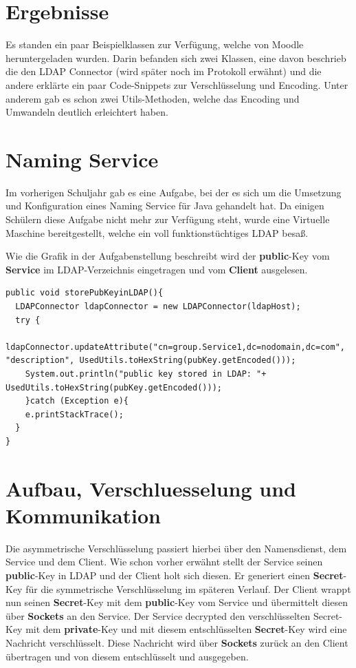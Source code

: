 
\section{Ergebnisse}
\label{sec:Ergebnisse}
Es standen ein paar Beispielklassen zur Verfügung, welche von Moodle heruntergeladen wurden. Darin befanden sich zwei Klassen, eine davon beschrieb die den LDAP Connector (wird später noch im Protokoll erwähnt) und die andere erklärte ein paar Code-Snippets zur Verschlüsselung und Encoding. Unter anderem gab es schon zwei Utils-Methoden, welche das Encoding und Umwandeln deutlich erleichtert haben.

\section{Naming Service}
\label{sec:Naming Service}
Im vorherigen Schuljahr gab es eine Aufgabe, bei der es sich um die Umsetzung und Konfiguration eines Naming Service für Java gehandelt hat. Da einigen Schülern diese Aufgabe nicht mehr zur Verfügung steht, wurde eine Virtuelle Maschine bereitgestellt, welche ein voll funktionstüchtiges LDAP besaß.

Wie die Grafik in der Aufgabenstellung beschreibt wird der \textbf{public}-Key vom \textbf{Service} im LDAP-Verzeichnis eingetragen und vom \textbf{Client} ausgelesen.

\begin{lstlisting}[style=Java, caption=LDAP store public-Key in LDAP]
public void storePubKeyinLDAP(){
  LDAPConnector ldapConnector = new LDAPConnector(ldapHost);
  try {
    ldapConnector.updateAttribute("cn=group.Service1,dc=nodomain,dc=com", "description", UsedUtils.toHexString(pubKey.getEncoded()));
    System.out.println("public key stored in LDAP: "+ UsedUtils.toHexString(pubKey.getEncoded()));
    }catch (Exception e){
    e.printStackTrace();
  }
}
\end{lstlisting}

\section{Aufbau, Verschluesselung und Kommunikation}
\label{sec:Aufbau}
Die asymmetrische Verschlüsselung passiert hierbei über den Namensdienst, dem Service und dem Client. Wie schon vorher erwähnt stellt der Service seinen
\textbf{public}-Key in LDAP und der Client holt sich diesen. Er generiert einen \textbf{Secret}-Key für die symmetrische Verschlüsselung im späteren Verlauf.
Der Client wrappt nun seinen \textbf{Secret}-Key mit dem \textbf{public}-Key vom Service und übermittelt diesen über \textbf{Sockets} an den Service. Der Service
decrypted den verschlüsselten Secret-Key mit dem \textbf{private}-Key und mit diesem entschlüsselten \textbf{Secret}-Key wird eine Nachricht verschlüsselt. Diese Nachricht
wird über \textbf{Sockets} zurück an den Client übertragen und von diesem entschlüsselt und ausgegeben.

